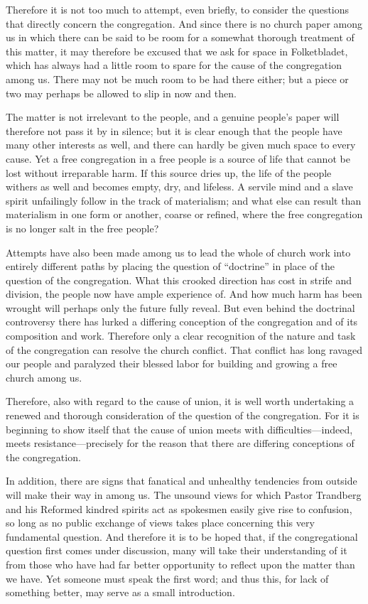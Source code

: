 Therefore it is not too much to attempt, even briefly, to consider the questions that directly concern the congregation. And since there is no church paper among us in which there can be said to be room for a somewhat thorough treatment of this matter, it may therefore be excused that we ask for space in Folketbladet, which has always had a little room to spare for the cause of the congregation among us. There may not be much room to be had there either; but a piece or two may perhaps be allowed to slip in now and then.

The matter is not irrelevant to the people, and a genuine people’s paper will therefore not pass it by in silence; but it is clear enough that the people have many other interests as well, and there can hardly be given much space to every cause. Yet a free congregation in a free people is a source of life that cannot be lost without irreparable harm. If this source dries up, the life of the people withers as well and becomes empty, dry, and lifeless. A servile mind and a slave spirit unfailingly follow in the track of materialism; and what else can result than materialism in one form or another, coarse or refined, where the free congregation is no longer salt in the free people?

Attempts have also been made among us to lead the whole of church work into entirely different paths by placing the question of “doctrine” in place of the question of the congregation. What this crooked direction has cost in strife and division, the people now have ample experience of. And how much harm has been wrought will perhaps only the future fully reveal. But even behind the doctrinal controversy there has lurked a differing conception of the congregation and of its composition and work. Therefore only a clear recognition of the nature and task of the congregation can resolve the church conflict. That conflict has long ravaged our people and paralyzed their blessed labor for building and growing a free church among us.

Therefore, also with regard to the cause of union, it is well worth undertaking a renewed and thorough consideration of the question of the congregation. For it is beginning to show itself that the cause of union meets with difficulties—indeed, meets resistance—precisely for the reason that there are differing conceptions of the congregation.


In addition, there are signs that fanatical and unhealthy tendencies from outside will make their way in among us. The unsound views for which Pastor Trandberg and his Reformed kindred spirits act as spokesmen easily give rise to confusion, so long as no public exchange of views takes place concerning this very fundamental question. And therefore it is to be hoped that, if the congregational question first comes under discussion, many will take their understanding of it from those who have had far better opportunity to reflect upon the matter than we have. Yet someone must speak the first word; and thus this, for lack of something better, may serve as a small introduction.

